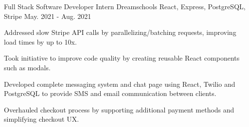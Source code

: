 \begin{cventries}
  \cventry
    {Full Stack Software Developer Intern} %
    {Dreamschools} %
    {React, Express, PostgreSQL, Stripe} %
    {May. 2021 - Aug. 2021} %
    {
      \begin{cvitems} %
        \item {Addressed slow Stripe API calls by parallelizing/batching requests, improving load times by up to 10x.}
        \item {Took initiative to improve code quality by creating reusable React components such as modals.}
        \item {Developed complete messaging system and chat page using React, Twilio and PostgreSQL to provide SMS and email communication between clients.}
        \item {Overhauled checkout process by supporting additional payment methods and simplifying checkout UX.}
      \end{cvitems}
    }
\end{cventries}
